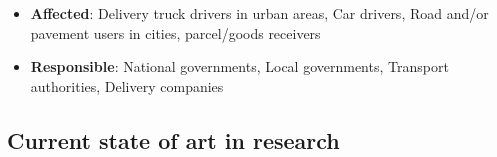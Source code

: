 \documentclass[
]{book}
\providecommand{\tightlist}{%
  \setlength{\itemsep}{0pt}\setlength{\parskip}{0pt}}
\begin{document}
\begin{itemize}
\tightlist
\item
  \textbf{Affected}: Delivery truck drivers in urban areas, Car drivers, Road and/or pavement users in cities, parcel/goods receivers
\item
  \textbf{Responsible}: National governments, Local governments, Transport authorities, Delivery companies
\end{itemize}

\hypertarget{current-state-of-art-in-research-32}{%
\subsection*{Current state of art in research}\label{current-state-of-art-in-research-32}}
\end{document}
